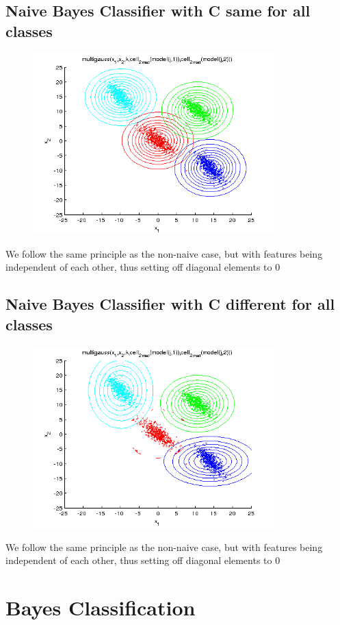 \documentclass[11pt,a4paper]{article}
\begin{document}
 \subsection{Naive Bayes Classifier with C same for all classes}
  \begin{figure}[H]
		\centering
\includegraphics[height=7cm]{Figures/contour_4.png}
\end{figure}
We follow the same principle as the non-naive case, but with features being independent of each other, thus setting off diagonal elements to 0
 \subsection{Naive Bayes Classifier with C different for all classes} 
  \begin{figure}[H]
		\centering
\includegraphics[height=7cm]{Figures/contour_5.png}
\end{figure}
We follow the same principle as the non-naive case, but with features being independent of each other, thus setting off diagonal elements to 0

\section{Bayes Classification}
\end{document}
